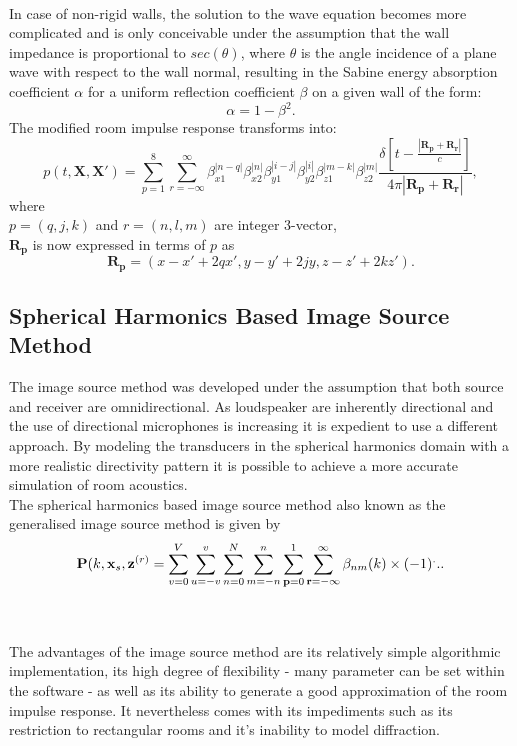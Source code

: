 \\
In case of non-rigid walls, the solution to the wave equation becomes more complicated and is only conceivable under the assumption that the wall impedance is proportional to $sec(\theta)$, where $\theta$ is the angle incidence of a plane wave with respect to the wall normal, resulting in the Sabine energy absorption coefficient $\alpha$ for a uniform reflection coefficient $\beta$ on a given wall of the form\cite{Allen1979}:
\begin{equation}
    \alpha=1-\beta^2.
\end{equation}
The modified room impulse response transforms into:
\begin{equation}
    p(t,\mathbf{X},\mathbf{X'})=\sum_{p=1}^8\sum_{r=-\infty}^\infty
    \beta_{x1}^{|n-q|}\beta_{x2}^{|n|}\beta_{y1}^{|i-j|}\beta_{y2}^{|i|}\beta_{z1}^{|m-k|}\beta_{z2}^{|m|}
    \frac{\delta[t-\frac{|\mathbf{R_p}+\mathbf{R_r}|}{c}]}{4\pi|\mathbf{R_p}+\mathbf{R_r}|},
\end{equation}
where\\
$p=(q,j,k)$ and $r=(n,l,m)$ are integer 3-vector,\\
$\mathbf{R_p}$ is now expressed in terms of $p$ as
\begin{equation}
    \mathbf{R_p}=(x-x'+2qx', y-y'+2jy,z-z'+2kz').
\end{equation}


\subsection{Spherical Harmonics Based Image Source Method}
The image source method was developed under the assumption that both source and receiver are omnidirectional. As loudspeaker are inherently directional and the use of directional microphones is increasing it is expedient to use a different approach. By modeling the transducers in the spherical harmonics domain with a more realistic directivity pattern it is possible to achieve a more accurate simulation of room acoustics.\cite{Samarasinghe2018}\\
The spherical harmonics based image source method also known as the generalised image source method is given by
\begin{equation}
    \mathbf{P}(k,\mathbf{x}_s,\mathbf{z}^{(r)} = \sum_{v=0}^V\sum_{u=-v}^v\sum_{n=0}^N\sum_{m=-n}^n\sum_{\mathbf{p}=0}^1\sum_{\mathbf{r}=-\infty}^\infty\beta_{nm}(k)\\
    \times (-1)^...
\end{equation}

\\
\\The advantages of the image source method are its relatively simple algorithmic implementation, its high degree of flexibility - many parameter can be set within the software - as well as its ability to generate a good approximation of the room impulse response. It nevertheless comes with its impediments such as its restriction to rectangular rooms and it's inability to model diffraction.\cite{Samarasinghe2018}